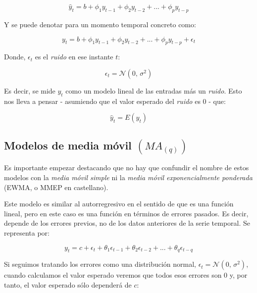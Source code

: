 \begin{equation}
	\hat{y}_{t} = b + \phi_{1}y_{t-1} + \phi_{2}y_{t-2} + ... + \phi_{p}y_{t-p}
\end{equation}

Y se puede denotar para un momento temporal concreto como:

\begin{equation}
	y_{t} = b + \phi_{1}y_{t-1} + \phi_{2}y_{t-2} + ... + \phi_{p}y_{t-p} + \epsilon_{t}
\end{equation}

Donde, $\epsilon_{t}$ es el \emph{ruido} en ese instante $t$: 

\begin{equation}
	\epsilon_{t} = \mathcal{N}(0,\,\sigma^{2})
\end{equation}

Es decir, se mide $y_{t}$ como un modelo lineal de las entradas más un \emph{ruido}. Esto nos lleva a pensar - asumiendo que el valor esperado del \emph{ruido} es 0 - que:

\begin{equation}
	\hat{y}_{t} = E(y_{t})
\end{equation}



\subsection{Modelos de media móvil $(MA_{(q)})$}

Es importante empezar destacando que no hay que confundir el nombre de estos modelos con la \emph{media móvil simple} ni la \emph{media móvil exponencialmente ponderada} (EWMA, o MMEP en castellano). 

Este modelo es similar al autorregresivo en el sentido de que es una función lineal, pero en este caso es una función en términos de errores pasados. Es decir, depende de los errores previos, no de los datos anteriores de la serie temporal. Se representa por:

\begin{equation}
	y_{t} = c + \epsilon_{t} + \theta_{1}\epsilon_{t-1} + \theta_{2}\epsilon_{t-2} + ... + \theta_{q}\epsilon_{t-q}
\end{equation}


Si seguimos tratando los errores como una distribución normal, $\epsilon_{t} = \mathcal{N}(0,\,\sigma^{2})$, cuando calculamos el valor esperado veremos que todos esos errores son 0 y, por tanto, el valor esperado sólo dependerá de $c$:


